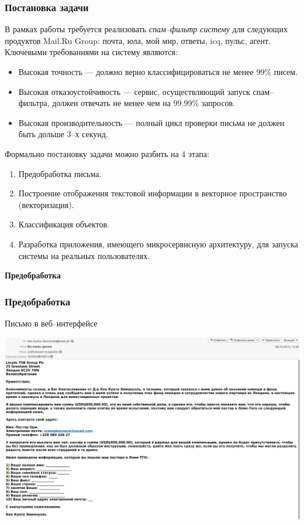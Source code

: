 \documentclass[compress,professionalfont]{beamer}
\begin{document}
\begin{frame}
\frametitle{Постановка задачи}

В рамках работы требуется реализовать \emph{спам--фильтр систему} для следующих продуктов Mail.Ru Group: почта, юла, мой мир, ответы, icq, пульс, агент. Ключевыми требованиями на систему являются:
\begin{itemize}
\item Высокая точность --- должно верно классифицироваться не менее 99\% писем.
\item Высокая отказоустойчивость --- сервис, осуществляющий запуск спам--фильтра, должен отвечать не менее чем на 99.99\% запросов.
\item Высокая производительность --- полный цикл проверки письма не должен быть дольше 3--х секунд.
\end{itemize}

Формально постановку задачи можно разбить на 4 этапа:
\begin{enumerate}
\item Предобработка письма.
\item Построение отображения текстовой информации в векторное пространство (векторизация).
\item Классификация объектов.
\item Разработка приложения, имеющего микросервисную архитектуру, для запуска системы на реальных пользователях.
\end{enumerate}

\end{frame}

\begin{frame}

\begin{center}
\Huge\bf Предобработка
\end{center}

\end{frame}

\begin{frame}
\frametitle{Предобработка}

Письмо в веб--интерфейсе
\begin{center}
\includegraphics[width=.9\textwidth]{eml.jpg}
\end{center}

\end{frame}
\end{document}
